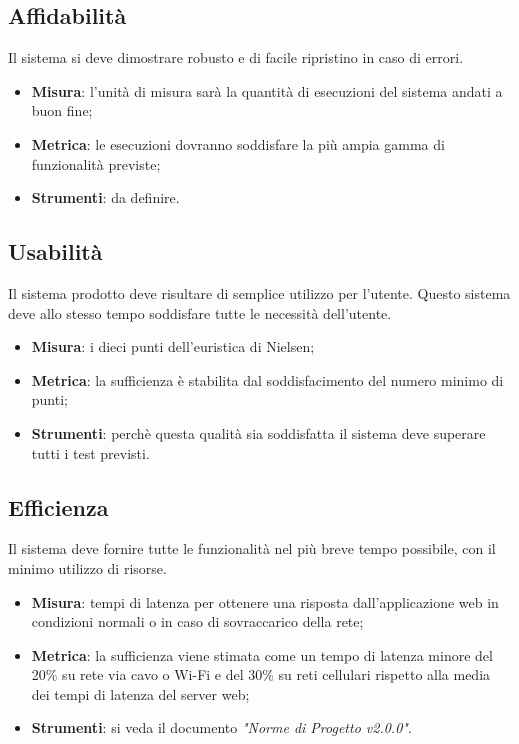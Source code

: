 \documentclass[12pt,a4paper,titlepage]{article}
\begin{document}
		\subsection{Affidabilità}
		Il sistema si deve dimostrare robusto e di facile ripristino in caso di errori.
		\begin{itemize}
			\item \textbf{Misura}: l'unità di misura sarà la quantità di esecuzioni del sistema andati a buon fine;
			\item \textbf{Metrica}: le esecuzioni dovranno soddisfare la più ampia gamma di funzionalità previste;
			\item \textbf{Strumenti}: da definire.
		\end{itemize}
	
		\subsection{Usabilità}
		Il sistema prodotto deve risultare di semplice utilizzo per l'utente. Questo sistema deve allo stesso tempo soddisfare tutte le necessità dell'utente.
		\begin{itemize}
			\item \textbf{Misura}: i dieci punti dell'euristica di Nielsen;
			\item \textbf{Metrica}: la sufficienza è stabilita dal soddisfacimento del numero minimo di punti;
			\item \textbf{Strumenti}: perchè questa qualità sia soddisfatta il sistema deve superare tutti i test previsti.
		\end{itemize}
	
		\subsection{Efficienza}
		Il sistema deve fornire tutte le funzionalità nel più breve tempo possibile, con il minimo utilizzo di risorse.
		\begin{itemize}
			\item \textbf{Misura}: tempi di latenza per ottenere una risposta dall'applicazione web in condizioni normali o in caso di sovraccarico della rete;
			\item \textbf{Metrica}: la sufficienza viene stimata come un tempo di latenza minore del 20\% su rete via cavo o Wi-Fi e del 30\% su reti cellulari rispetto alla media dei tempi di latenza del server web;
			\item \textbf{Strumenti}: si veda il documento \textit{"Norme di Progetto v2.0.0"}.
		\end{itemize}
	
\end{document}
